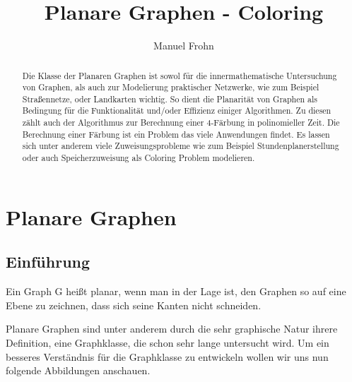 \documentclass[runningheads]{llncs}
\begin{document}
\title{Planare Graphen - Coloring}
\author{Manuel Frohn}

\maketitle

\begin{abstract}
Die Klasse der Planaren Graphen ist sowol für die innermathematische Untersuchung von Graphen, als auch zur Modelierung
praktischer Netzwerke, wie zum Beispiel Straßennetze, oder Landkarten wichtig. So dient die Planarität von Graphen als 
Bedingung für die Funktionalität und/oder Effizienz einiger Algorithmen. Zu diesen zählt auch der Algorithmus zur 
Berechnung einer  4-Färbung in polinomieller Zeit. Die Berechnung einer Färbung ist ein Problem das viele Anwendungen
findet. Es lassen sich unter anderem viele Zuweisungsprobleme wie zum Beispiel Stundenplanerstellung oder auch 
Speicherzuweisung als Coloring Problem modelieren. 

\end{abstract}

\newpage

\section{Planare Graphen}
\subsection{Einführung}
\begin{definition}[Planarität]
    Ein Graph G heißt planar, wenn man in der Lage ist, den Graphen so auf eine Ebene zu zeichnen, dass sich seine 
    Kanten nicht schneiden.
\end{definition}
Planare Graphen sind unter anderem durch die sehr graphische Natur ihrere Definition, eine Graphklasse, die schon sehr
lange untersucht wird. Um ein besseres Verständnis für die Graphklasse zu entwickeln wollen wir uns nun folgende Abbildungen
anschauen.
\end{document}
